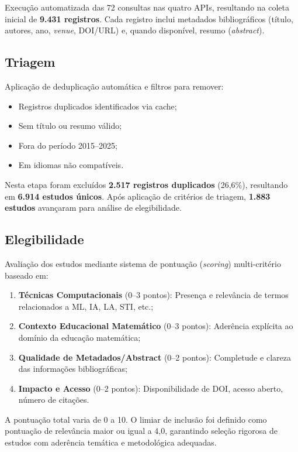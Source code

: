 Execução automatizada das 72 consultas nas quatro APIs, resultando na coleta inicial de \textbf{9.431 registros}. Cada registro inclui metadados bibliográficos (título, autores, ano, \textit{venue}, DOI/URL) e, quando disponível, resumo (\textit{abstract}).

\subsection{Triagem}

Aplicação de deduplicação automática e filtros para remover:
\begin{itemize}
    \item Registros duplicados identificados via cache;
    \item Sem título ou resumo válido;
    \item Fora do período 2015--2025;
    \item Em idiomas não compatíveis.
\end{itemize}

Nesta etapa foram excluídos \textbf{2.517 registros duplicados} (26,6\%), resultando em \textbf{6.914 estudos únicos}. Após aplicação de critérios de triagem, \textbf{1.883 estudos} avançaram para análise de elegibilidade.

\subsection{Elegibilidade}

Avaliação dos estudos mediante sistema de pontuação (\textit{scoring}) multi-critério baseado em:

\begin{enumerate}
    \item \textbf{Técnicas Computacionais} (0--3 pontos): Presença e relevância de termos relacionados a ML, IA, LA, STI, etc.;
    \item \textbf{Contexto Educacional Matemático} (0--3 pontos): Aderência explícita ao domínio da educação matemática;
    \item \textbf{Qualidade de Metadados/Abstract} (0--2 pontos): Completude e clareza das informações bibliográficas;
    \item \textbf{Impacto e Acesso} (0--2 pontos): Disponibilidade de DOI, acesso aberto, número de citações.
\end{enumerate}

A pontuação total varia de 0 a 10. O limiar de inclusão foi definido como pontuação de relevância maior ou igual a 4,0, garantindo seleção rigorosa de estudos com aderência temática e metodológica adequadas.

